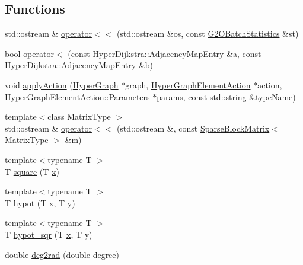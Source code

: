 \subsection*{Functions}
\begin{DoxyCompactItemize}
\item 
std\+::ostream \& \hyperlink{namespaceg2o_a018b0f839c5efbe3cfadca1e136f7a97}{operator$<$$<$} (std\+::ostream \&os, const \hyperlink{structg2o_1_1G2OBatchStatistics}{G2\+O\+Batch\+Statistics} \&st)
\item 
bool \hyperlink{namespaceg2o_a2a6eaf50f7bfb542915d123feee52f6a}{operator$<$} (const \hyperlink{structg2o_1_1HyperDijkstra_1_1AdjacencyMapEntry}{Hyper\+Dijkstra\+::\+Adjacency\+Map\+Entry} \&a, const \hyperlink{structg2o_1_1HyperDijkstra_1_1AdjacencyMapEntry}{Hyper\+Dijkstra\+::\+Adjacency\+Map\+Entry} \&b)
\item 
void \hyperlink{namespaceg2o_adfc887e1554f0b023669ac9de085e3ab}{apply\+Action} (\hyperlink{classg2o_1_1HyperGraph}{Hyper\+Graph} $\ast$graph, \hyperlink{classg2o_1_1HyperGraphElementAction}{Hyper\+Graph\+Element\+Action} $\ast$action, \hyperlink{structg2o_1_1HyperGraphElementAction_1_1Parameters}{Hyper\+Graph\+Element\+Action\+::\+Parameters} $\ast$params, const std\+::string \&type\+Name)
\item 
{\footnotesize template$<$class Matrix\+Type $>$ }\\std\+::ostream \& \hyperlink{namespaceg2o_ab3e31c5c97f4edd83df73c791b7b0e81}{operator$<$$<$} (std\+::ostream \&, const \hyperlink{classg2o_1_1SparseBlockMatrix}{Sparse\+Block\+Matrix}$<$ Matrix\+Type $>$ \&m)
\item 
{\footnotesize template$<$typename T $>$ }\\T \hyperlink{namespaceg2o_ada3127f4fe72b228407fabe23b72a50b}{square} (T \hyperlink{sparse__helper_8cpp_af88b946fb90d5f08b5fb740c70e98c10}{x})
\item 
{\footnotesize template$<$typename T $>$ }\\T \hyperlink{namespaceg2o_a586ee8937cdc8de49303abd1611da387}{hypot} (T \hyperlink{sparse__helper_8cpp_af88b946fb90d5f08b5fb740c70e98c10}{x}, T y)
\item 
{\footnotesize template$<$typename T $>$ }\\T \hyperlink{namespaceg2o_ac2989135761e62b40066193a11950d21}{hypot\+\_\+sqr} (T \hyperlink{sparse__helper_8cpp_af88b946fb90d5f08b5fb740c70e98c10}{x}, T y)
\item 
double \hyperlink{namespaceg2o_a8f29adce7d7b9855e1d0ba43835c34b3}{deg2rad} (double degree)

\end{DoxyCompactItemize}

